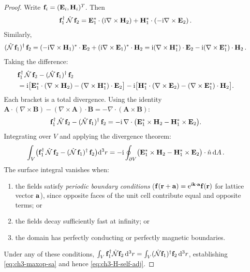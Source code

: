 \begin{proof}
Write $\mathbf{f}_i=(\mathbf{E}_i,\mathbf{H}_i)^T$.  Then
\begin{equation}
  \mathbf{f}_1^\dagger\,\hat{\mathcal{N}}\,\mathbf{f}_2
  = \mathbf{E}_1^*\cdot(\mathrm{i}\nabla\times\mathbf{H}_2)
    + \mathbf{H}_1^*\cdot(-\mathrm{i}\nabla\times\mathbf{E}_2)\,.
\end{equation}
Similarly,
\begin{equation}
  (\hat{\mathcal{N}}\,\mathbf{f}_1)^\dagger\,\mathbf{f}_2
  = (-\mathrm{i}\nabla\times\mathbf{H}_1)^*\cdot\mathbf{E}_2
    + (\mathrm{i}\nabla\times\mathbf{E}_1)^*\cdot\mathbf{H}_2
  = \mathrm{i}(\nabla\times\mathbf{H}_1^*)\cdot\mathbf{E}_2
    - \mathrm{i}(\nabla\times\mathbf{E}_1^*)\cdot\mathbf{H}_2\,.
\end{equation}
Taking the difference:
\begin{align}
  &\mathbf{f}_1^\dagger\,\hat{\mathcal{N}}\,\mathbf{f}_2
   - (\hat{\mathcal{N}}\,\mathbf{f}_1)^\dagger\,\mathbf{f}_2 \notag\\
  &= \mathrm{i}\bigl[
    \mathbf{E}_1^*\cdot(\nabla\times\mathbf{H}_2)
    - (\nabla\times\mathbf{H}_1^*)\cdot\mathbf{E}_2
  \bigr]
  -\mathrm{i}\bigl[
    \mathbf{H}_1^*\cdot(\nabla\times\mathbf{E}_2)
    - (\nabla\times\mathbf{E}_1^*)\cdot\mathbf{H}_2
  \bigr]. \label{eq:ch3-sa-diff}
\end{align}
Each bracket is a total divergence.  Using the identity
$\mathbf{A}\cdot(\nabla\times\mathbf{B})
-(\nabla\times\mathbf{A})\cdot\mathbf{B}
= -\nabla\cdot(\mathbf{A}\times\mathbf{B})$:
\begin{equation}\label{eq:ch3-sa-divergence}
  \mathbf{f}_1^\dagger\,\hat{\mathcal{N}}\,\mathbf{f}_2
  - (\hat{\mathcal{N}}\,\mathbf{f}_1)^\dagger\,\mathbf{f}_2
  = -\mathrm{i}\,\nabla\cdot\bigl(
    \mathbf{E}_1^*\times\mathbf{H}_2
    - \mathbf{H}_1^*\times\mathbf{E}_2
  \bigr).
\end{equation}
Integrating over $V$ and applying the divergence theorem:
\begin{equation}\label{eq:ch3-boundary-term}
  \int_V\bigl(\mathbf{f}_1^\dagger\,\hat{\mathcal{N}}\,\mathbf{f}_2
  - (\hat{\mathcal{N}}\,\mathbf{f}_1)^\dagger\,\mathbf{f}_2\bigr)\mathrm{d}^3r
  = -\mathrm{i}\oint_{\partial V}\bigl(
    \mathbf{E}_1^*\times\mathbf{H}_2
    - \mathbf{H}_1^*\times\mathbf{E}_2
  \bigr)\cdot\hat{n}\,\mathrm{d} A\,.
\end{equation}
The surface integral vanishes when:
\begin{enumerate}[label=(\alph*)]
  \item the fields satisfy \emph{periodic boundary conditions}
    ($\mathbf{f}(\mathbf{r}+\mathbf{a})=\mathrm{e}^{\mathrm{i}\mathbf{k}\cdot\mathbf{a}}\mathbf{f}(\mathbf{r})$
    for lattice vector $\mathbf{a}$), since opposite faces of the unit cell
    contribute equal and opposite terms; or
  \item the fields decay sufficiently fast at infinity; or
  \item the domain has perfectly conducting or perfectly magnetic boundaries.
\end{enumerate}
Under any of these conditions,
$\int_V\mathbf{f}_1^\dagger\hat{\mathcal{N}}\mathbf{f}_2\,\mathrm{d}^3r
=\int_V(\hat{\mathcal{N}}\mathbf{f}_1)^\dagger\mathbf{f}_2\,\mathrm{d}^3r$,
establishing \eqref{eq:ch3-maxop-sa} and hence
\eqref{eq:ch3-H-self-adj}.
\end{proof}

